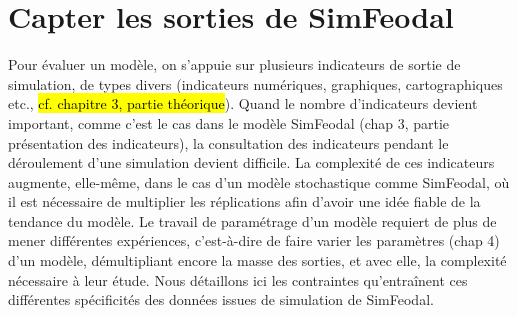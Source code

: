 %
%
%
%

\section{Capter les sorties de SimFeodal}

Pour évaluer un modèle, on s’appuie sur plusieurs indicateurs de sortie de simulation, de types divers (indicateurs numériques, graphiques, cartographiques etc., \hl{cf. chapitre 3, partie théorique}).
Quand le nombre d'indicateurs devient important, comme c'est le cas dans le modèle SimFeodal (chap 3, partie présentation des indicateurs), la consultation des indicateurs pendant le déroulement d'une simulation devient difficile.
La complexité de ces indicateurs augmente, elle-même, dans le cas d'un modèle stochastique comme SimFeodal, où il est nécessaire de multiplier les réplications afin d'avoir une idée fiable de la tendance du modèle.
Le travail de paramétrage d'un modèle requiert de plus de mener différentes expériences, c'est-à-dire de faire varier les paramètres (chap 4) d'un modèle, démultipliant encore la masse des sorties, et avec elle, la complexité nécessaire à leur étude.
Nous détaillons ici les contraintes qu’entraînent ces différentes spécificités des données issues de simulation de SimFeodal. 

